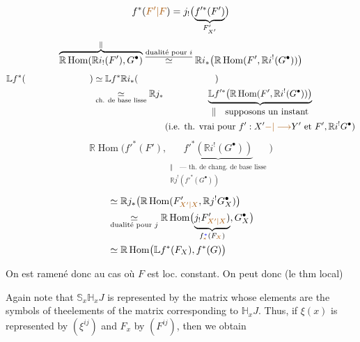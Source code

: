 \[
f^*(\unsure{F'|F})=j_!\bigl(\underbrace{f'^*(F')}_{F'_{X'}}\bigr)
\]
\[
\overbrace{\mathbb{R}\operatorname{Hom}(\mathbb{R}i_!(F'),G^\bullet)}^{\Vert}
\overset{\text{\uline{dualité pour $i$}}}{\simeq}
\mathbb{R}i_*\bigl(\mathbb{R}\operatorname{Hom}(F',\mathbb{R}i^!(G^\bullet))\bigr)
\]
\[
\begin{aligned}
\mathbb{L}f^*(\hspace{2.5cm})&\simeq \mathbb{L}f^*\mathbb{R}i_*(\hspace{3cm})\\
&\underset{\text{ch. de base lisse}}{\simeq}
\mathbb{R}j_*\underbrace{\mathbb{L}f'^*\bigl(\mathbb{R}\operatorname{Hom}(F',\mathbb{R}i^!(G^\bullet))\bigr)}_{
\begin{gathered}
\Vert\quad\text{supposons un instant}\\
\text{(i.e. th. vrai pour $f':X'\unsure{-|\longrightarrow}Y'$ et $F',\mathbb{R}i^!G^\bullet$)}
\end{gathered}}
\end{aligned}
\]
\[
\mathbb{R}\operatorname{Hom}\bigl(f'^*(F'),
\underbrace{f'^*(\mathbb{R}i^!(G^\bullet))}_{
\begin{gathered}
\Vert\quad\text{--- th. de chang. de base lisse}\\
\mathbb{R}j^!(f'^*(G^\bullet))
\end{gathered}}\bigr)
\]
\[
\begin{aligned}
&\simeq \mathbb{R}j_*\bigl(\mathbb{R}\operatorname{Hom}(F'_{\unsure{X'|X}},\mathbb{R}j^!G_X^\bullet)\bigr)\\
&\underset{\text{dualité pour $j$}}{\simeq}
\mathbb{R}\operatorname{Hom}\bigl(\underbrace{j_!F'_{\unsure{X'|X}})}_{
f^{\inserted{*}}_{\deleted{\unsure{*}}}(F_{\deleted{\unsure{X}}})},G_X^\bullet\bigr)\\
&\simeq \mathbb{R}\operatorname{Hom}\bigl(\mathbb{L}f^*(F_X),f^*(G)\bigr)
\end{aligned}
\]

On est ramené donc au cas où $F$ est loc. constant. On peut donc (le thm  local)

Again note that $\mathbb S_x\mathbb H_xJ$ is represented by the matrix whose elements are the symbols of theelements of the matrix corresponding to $\mathbb H_xJ$. Thus, if $\xi(x)$ is represented by $(\xi^{ij})$ and $F_x$ by $(F^{ij})$, then we obtain

